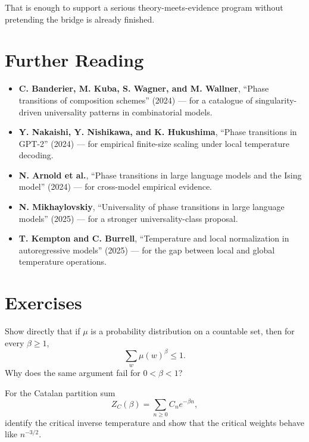 That is enough to support a serious theory-meets-evidence program without pretending the bridge is already finished.

\section*{Further Reading}

\begin{itemize}
  \item \textbf{C. Banderier, M. Kuba, S. Wagner, and M. Wallner}, ``Phase transitions of composition schemes'' (2024) \cite{BanderierKubaWallner2021} --- for a catalogue of singularity-driven universality patterns in combinatorial models.
  \item \textbf{Y. Nakaishi, Y. Nishikawa, and K. Hukushima}, ``Phase transitions in GPT-2'' (2024) \cite{NakaishiNishikawaHukushima2024} --- for empirical finite-size scaling under local temperature decoding.
  \item \textbf{N. Arnold et al.}, ``Phase transitions in large language models and the Ising model'' (2024) \cite{ArnoldEtAl2024} --- for cross-model empirical evidence.
  \item \textbf{N. Mikhaylovskiy}, ``Universality of phase transitions in large language models'' (2025) \cite{Mikhaylovskiy2025} --- for a stronger universality-class proposal.
  \item \textbf{T. Kempton and C. Burrell}, ``Temperature and local normalization in autoregressive models'' (2025) \cite{KemptonBurrell2025} --- for the gap between local and global temperature operations.
\end{itemize}

\section{Exercises}

\begin{exercise}
Show directly that if $\mu$ is a probability distribution on a countable set, then for every $\beta \ge 1$,
\[
  \sum_w \mu(w)^\beta \le 1.
\]
Why does the same argument fail for $0<\beta<1$?
\end{exercise}

\begin{exercise}
For the Catalan partition sum
\[
  Z_C(\beta)=\sum_{n \ge 0} C_n e^{-\beta n},
\]
identify the critical inverse temperature and show that the critical weights behave like $n^{-3/2}$.
\end{exercise}
